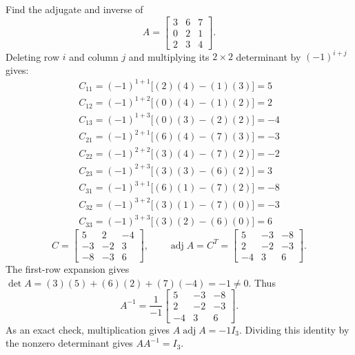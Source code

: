 \goal Find the adjugate and inverse of
\[A=\begin{bmatrix}3&6&7\\0&2&1\\2&3&4\end{bmatrix}.\]
Deleting row $i$ and column $j$ and multiplying its $2\times2$ determinant by $(-1)^{i+j}$ gives:
\[\begin{gathered}
C_{11}=(-1)^{1+1}\big[(2)(4)-(1)(3)\big]=5\\C_{12}=(-1)^{1+2}\big[(0)(4)-(1)(2)\big]=2\\C_{13}=(-1)^{1+3}\big[(0)(3)-(2)(2)\big]=-4\\C_{21}=(-1)^{2+1}\big[(6)(4)-(7)(3)\big]=-3\\C_{22}=(-1)^{2+2}\big[(3)(4)-(7)(2)\big]=-2\\C_{23}=(-1)^{2+3}\big[(3)(3)-(6)(2)\big]=3\\C_{31}=(-1)^{3+1}\big[(6)(1)-(7)(2)\big]=-8\\C_{32}=(-1)^{3+2}\big[(3)(1)-(7)(0)\big]=-3\\C_{33}=(-1)^{3+3}\big[(3)(2)-(6)(0)\big]=6
\end{gathered}\]
\[C=\begin{bmatrix}5&2&-4\\-3&-2&3\\-8&-3&6\end{bmatrix},\qquad\operatorname{adj}A=C^T=\begin{bmatrix}5&-3&-8\\2&-2&-3\\-4&3&6\end{bmatrix}.\]
The first-row expansion gives $\det A=(3)(5) + (6)(2) + (7)(-4)=-1\ne0$. Thus
\[A^{-1}=\frac{1}{-1}\begin{bmatrix}5&-3&-8\\2&-2&-3\\-4&3&6\end{bmatrix}.\]
As an exact check, multiplication gives $A\operatorname{adj}A=-1I_3$. Dividing this identity by the nonzero determinant gives $AA^{-1}=I_3$.


